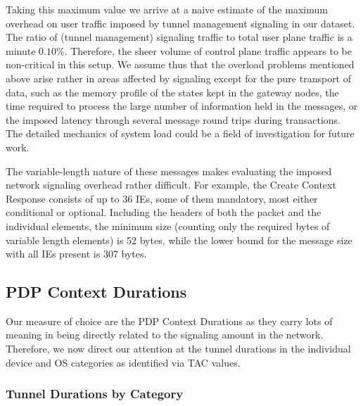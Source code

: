 Taking this maximum value we arrive at a naive estimate of the maximum overhead on user traffic imposed by tunnel management signaling in our dataset. The ratio of (tunnel management) signaling traffic to total user plane traffic is a minute $0.10\%$. Therefore, the sheer volume of control plane traffic appears to be non-critical in this setup. We assume thus that the overload problems mentioned above arise rather in areas affected by signaling except for the pure transport of data, such as the memory profile of the states kept in the gateway nodes, the time required to process the large number of information held in the messages, or the imposed latency through several message round trips during transactions. The detailed mechanics of system load could be a field of investigation for future work.

The variable-length nature of these messages makes evaluating the imposed network signaling overhead rather difficult. For example, the Create Context Response consists of up to 36 \glspl{IE}, some of them mandatory, most either conditional or optional. Including the headers of both the packet and the individual elements, the minimum size (counting only the required bytes of variable length elements) is 52 bytes, while the lower bound for the message size with all \glspl{IE} present is 307 bytes.






\subsection{\texorpdfstring{\acrshort{PDP}}{PDP} Context Durations}

Our measure of choice are the PDP Context Durations as they carry lots of meaning in being directly related to the signaling amount in the network. Therefore, we now direct our attention at the tunnel durations in the individual device and OS categories as identified via \gls{TAC} values.


\subsubsection{Tunnel Durations by Category}

